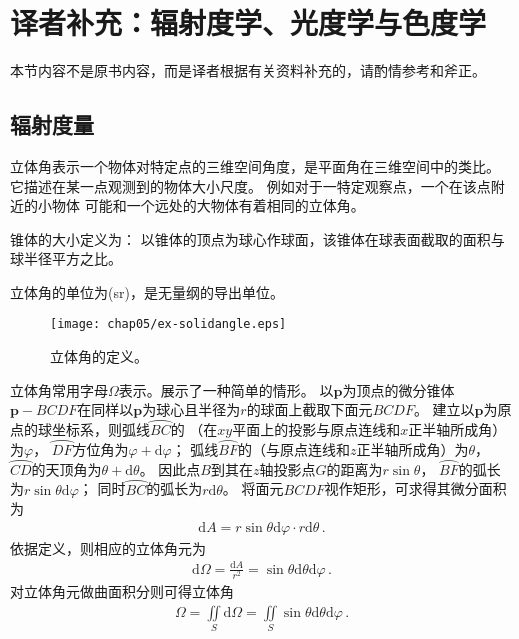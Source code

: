 \section{译者补充：辐射度学、光度学与色度学}\label{sec:译者补充：辐射度学、光度学与色度学}

\begin{remark}
      本节内容不是原书内容，而是译者根据有关资料\citep{978-7-5640-0658-7,
            wiki:solidangle,GB3102.6-93,enwiki:1052681830,
            wiki:candela,Hoffmann2015,wiki:eye,BERTALMIO2020131}补充的，请酌情参考和斧正。
\end{remark}

\subsection{辐射度量}\label{sub:辐射度量}
立体角表示一个物体对特定点的三维空间角度，是平面角在三维空间中的类比。
它描述在某一点观测到的物体大小尺度。
例如对于一特定观察点，一个在该点附近的小物体
可能和一个远处的大物体有着相同的立体角。
\begin{definition}
      锥体的大小定义为：
      以锥体的顶点为球心作球面，该锥体在球表面截取的面积与球半径平方之比。
\end{definition}
立体角的单位为(sr)，是无量纲的导出单位。

\begin{figure}[htbp]
      \centering\texttt{[image: chap05/ex-solidangle.eps]}
      \caption{立体角的定义。}
      \label{fig:5.ex01}
\end{figure}

立体角常用字母$\varOmega$表示。展示了一种简单的情形。
以$\bm p$为顶点的微分锥体${\bm p}-BCDF$在同样以$\bm p$为球心且半径为$r$的球面上截取下面元$BCDF$。
建立以$\bm p$为原点的球坐标系，则弧线$\wideparen{BC}$的
（在$xy$平面上的投影与原点连线和$x$正半轴所成角）为$\varphi$，
$\wideparen{DF}$方位角为$\varphi+\mathrm{d}\varphi$；
弧线$\wideparen{BF}$的（与原点连线和$z$正半轴所成角）为$\theta$，
$\wideparen{CD}$的天顶角为$\theta+\mathrm{d}\theta$。
因此点$B$到其在$z$轴投影点$G$的距离为$r\sin\theta$，
$\wideparen{BF}$的弧长为$r\sin\theta\mathrm{d}\varphi$；
同时$\wideparen{BC}$的弧长为$r\mathrm{d}\theta$。
将面元$BCDF$视作矩形，可求得其微分面积为
\begin{align}
      \mathrm{d}A=r\sin\theta\mathrm{d}\varphi\cdot r\mathrm{d}\theta\, .
\end{align}
依据定义，则相应的立体角元为
\begin{align}
      \mathrm{d}\varOmega=\frac{\mathrm{d}A}{r^2}=\sin\theta\mathrm{d}\theta\mathrm{d}\varphi\, .
\end{align}
对立体角元做曲面积分则可得立体角
\begin{align}
      \varOmega=\iint\limits_S \mathrm{d}\varOmega=\iint\limits_S \sin\theta\mathrm{d}\theta\mathrm{d}\varphi\, .
\end{align}

